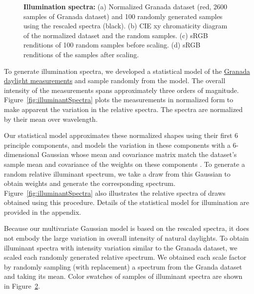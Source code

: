 \documentclass{jov}
\begin{document}
\begin{figure}
\begin{subfigure}[b]{0.24 \textwidth}
        \label{fig:sRGBIlluminantScaled}
    \end{subfigure}
    \caption{{\bf Illumination spectra:} (a) Normalized Granada dataset (red, 2600 samples of Granada dataset) and 100 randomly generated samples using the rescaled spectra (black). (b) CIE xy chromaticity diagram of the normalized dataset and the random samples. (c) sRGB renditions of 100 random samples before scaling. (d) sRGB renditions of the samples after scaling.}
\label{fig:illuminant}
\end{figure}

To generate illumination spectra, we developed a statistical model of the \href{http://colorimaginglab.ugr.es/pages/Data}{Granada daylight measurements} \cite{peyvandi2016colorimetric} and sample randomly from the model.
The overall intensity of the measurements spans approximately three orders of magnitude.
Figure~\ref{fig:illuminantSpectra} plots the measurements in normalized form to make apparent the variation in the relative spectra. The spectra are normalized by their mean over wavelength.

Our statistical model approximates these normalized shapes using their first 6 principle components, and models the variation in these components with
a 6-dimensional Gaussian whose mean and covariance matrix match the dataset's sample mean and covariance of the weights on these components \cite{BrainardFreeman}.
To generate a random relative illuminant spectrum, we take a draw from this Gaussian to obtain weights and generate the corresponding spectrum.
Figure~\ref{fig:illuminantSpectra} also illustrates the relative spectra of draws obtained using this procedure.
Details of the statistical model for illumination are provided in the appendix.

Because our multivariate Gaussian model is based on the rescaled spectra, it does not embody the large variation in overall intensity of natural daylights.
To obtain illuminant spectra with intensity variation similar to the Granada dataset, we scaled each randomly generated relative spectrum.
We obtained each scale factor by randomly sampling (with replacement) a spectrum from the Granda dataset and taking its mean. 
Color swatches of samples of illuminant spectra are shown in Figure~\ref{fig:illuminant}.
\end{document}
